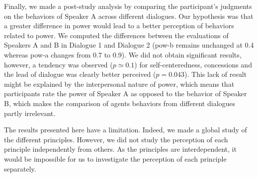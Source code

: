 \documentclass{llncs}
\begin{document}
	Finally, we made a post-study analysis by comparing the participant's judgments on the behaviors of Speaker A across different dialogues. Our hypothesis was that a greater difference in power would lead to a better perception of behaviors related to power. We computed the differences between the evaluations of Speakers A and B in Dialogue 1 and Dialogue 2 (pow-b remains unchanged at 0.4 whereas pow-a changes from 0.7 to 0.9). We did not obtain significant results, however, a tendency was observed ($p\simeq 0.1$) for 
	self-centeredness, concessions and the lead of dialogue was clearly better perceived ($p=0.043$). This lack of result might be explained by the interpersonal nature of power, which means that participants rate the power of Speaker A as opposed to the behavior of Speaker B, which makes the comparison of agents behaviors from different dialogues partly irrelevant.
	
	The results presented here have a limitation. Indeed, we made a global study of the different principles. However, we did not study the perception of each principle independently from others. As the principles are interdependent, it would be impossible for us to investigate the perception of each principle separately. 
	
\end{document}
